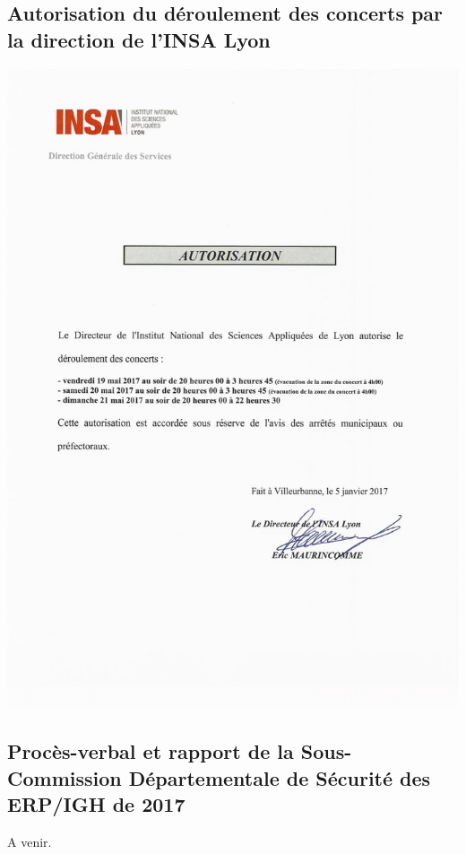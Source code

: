\documentclass[hidelinks, paper=a4, fontsize=13pt]{report}
\begin{document}
\subsection{Autorisation du déroulement des concerts par la direction de l’INSA Lyon}
\begin{center}
	\includegraphics[scale=0.70]{Annexes/Documents/INSAAutorisationConcerts}
\end{center}

\subsection{Procès-verbal et rapport de la Sous-Commission Départementale de Sécurité des ERP/IGH de 2017}
A venir.

\end{document}
